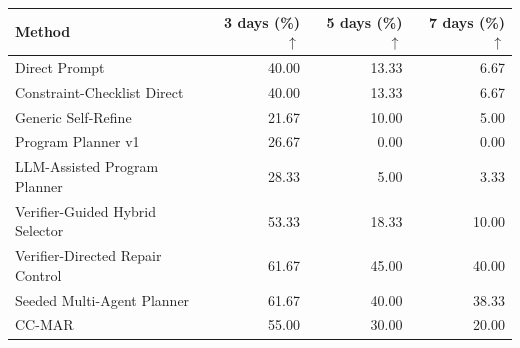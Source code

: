 \begin{tabular}{@{}lrrr@{}}
\toprule
Method & 3 days (\%) $\uparrow$ & 5 days (\%) $\uparrow$ & 7 days (\%) $\uparrow$ \\
\midrule
Direct Prompt & 40.00 & 13.33 & 6.67 \\
Constraint-Checklist Direct & 40.00 & 13.33 & 6.67 \\
Generic Self-Refine & 21.67 & 10.00 & 5.00 \\
Program Planner v1 & 26.67 & 0.00 & 0.00 \\
LLM-Assisted Program Planner & 28.33 & 5.00 & 3.33 \\
Verifier-Guided Hybrid Selector & 53.33 & 18.33 & 10.00 \\
Verifier-Directed Repair Control & 61.67 & 45.00 & 40.00 \\
Seeded Multi-Agent Planner & 61.67 & 40.00 & 38.33 \\
CC-MAR & 55.00 & 30.00 & 20.00 \\
\bottomrule
\end{tabular}
